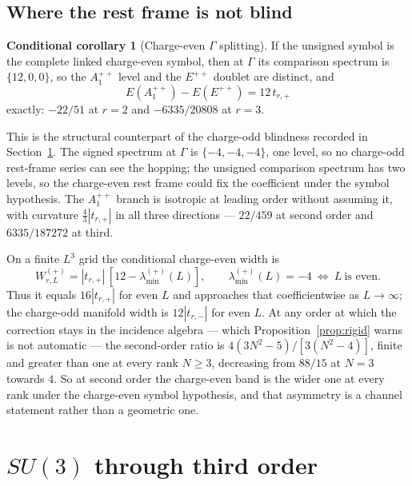 \documentclass[11pt]{article}
\theoremstyle{plain}
\theoremstyle{definition}
\newtheorem{conditional}[theorem]{Conditional corollary}
\theoremstyle{remark}
\newcommand{\chk}[1]{}
\begin{document}
\subsection{Where the rest frame is not blind}

\begin{conditional}[Charge-even $\Gamma$ splitting]\label{prop:evengamma}
If the unsigned symbol is the complete linked charge-even symbol, then at
$\Gamma$ its comparison spectrum is $\{12,0,0\}$, so the $A_1^{++}$ level
and the $E^{++}$ doublet are distinct, and
\[
  E(A_1^{++})-E(E^{++})=12\,t_{r,+}
\]
exactly: $-22/51$ at $r=2$ and $-6335/20808$ at $r=3$.
\end{conditional}
\chk{the C-even Gamma point pins t\_+, exactly where no C-odd Gamma datum can}

This is the structural counterpart of the charge-odd blindness recorded in
Section~\ref{sec:su3}. The signed spectrum at $\Gamma$ is $\{-4,-4,-4\}$, one
level, so no charge-odd rest-frame series can see the hopping; the unsigned
comparison spectrum has two levels, so the charge-even rest frame could fix
the coefficient under the symbol hypothesis. The $A_1^{++}$
branch is isotropic at leading order without assuming it, with curvature
$\tfrac43|t_{r,+}|$ in all three directions --- $22/459$ at second order and
$6335/187272$ at third.
\chk{the C-even curvature is (4/3)|t\_+| at both orders, and isotropic}

On a finite $L^3$ grid the conditional charge-even width is
\[
 W^{(+)}_{r,L}=|t_{r,+}|\,[12-\lambda_{\min}^{(+)}(L)],
 \qquad \lambda_{\min}^{(+)}(L)=-4\ \Longleftrightarrow\ L\ \text{is even}.
\]
Thus it equals $16|t_{r,+}|$ for even $L$ and approaches that coefficientwise
as $L\to\infty$; the charge-odd manifold width is $12|t_{r,-}|$ for even $L$.
At any order at which the correction
stays in the incidence algebra --- which Proposition~\ref{prop:rigid} warns is
not automatic --- the second-order ratio is $4(3N^2-5)/[3(N^2-4)]$, finite and
greater than one at every rank $N\ge3$, decreasing from $88/15$ at $N=3$
towards $4$. So at second order the charge-even band is the wider one at every
rank under the charge-even symbol hypothesis, and that asymmetry is a channel
statement rather than a geometric one.
\chk{the C-even bandwidth is 16|t\_+| at every order; the C-odd manifold width is 12|t\_-|}
\chk{at N = 2 the C-odd hopping vanishes and the C-even one does not}

\section{\texorpdfstring{$SU(3)$}{SU(3)} through third order}
\label{sec:su3}
\end{document}
